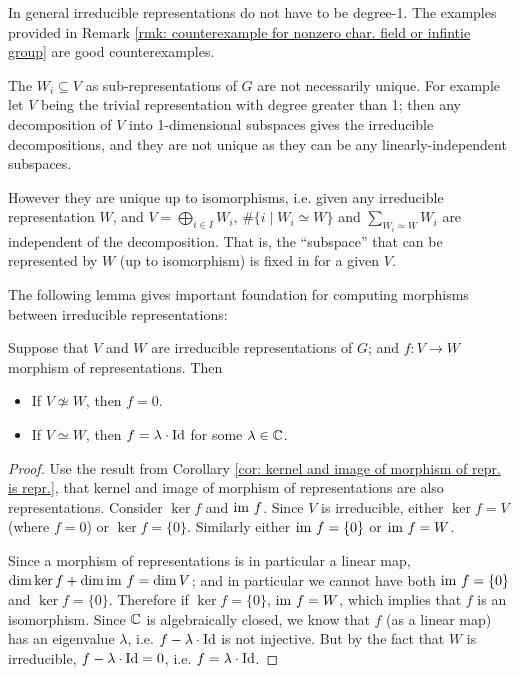 \documentclass{article}
\begin{document}
\begin{remark}
    In general irreducible representations do not have to be degree-1. The examples provided in Remark \ref{rmk: counterexample for nonzero char. field or infintie group} are good counterexamples. 
\end{remark}

\begin{remark}\label{rmk: decomposition of repr. unique up to isom}
    The $W_i \subseteq V$ as sub-representations of $G$ are not necessarily unique. For example let $V$ being the trivial representation with degree greater than 1; then any decomposition of $V$ into 1-dimensional subspaces gives the irreducible decompositions, and they are not unique as they can be any linearly-independent subspaces.

    However they are unique up to isomorphisms, i.e. given any irreducible representation $W$, and $V = \bigoplus_{i \in I} W_i$, $\#\{ i \mid W_i \simeq W \}$ and $\sum_{W_i \simeq W} W_i$ are independent of the decomposition. That is, the ``subspace'' that can be represented by $W$ (up to isomorphism) is fixed in for a given $V$. 
\end{remark}

\textstart
The following lemma gives important foundation for computing morphisms between irreducible representations:

\begin{lemma}[Schur]\label{lem: Schur}
    Suppose that $V$ and $W$ are irreducible representations of $G$; and $f: V \to W$ morphism of representations. Then
    \begin{itemize}
        \item If $V \nsimeq W$, then $f = 0$.
        \item If $V \simeq W$, then $f = \lambda\cdot\mathrm{Id}$ for some $\lambda \in \mathbb{C}$.
    \end{itemize}
\end{lemma}

\begin{proof}
    Use the result from Corollary \ref{cor: kernel and image of morphism of repr. is repr.}, that kernel and image of morphism of representations are also representations. Consider $\ker f$ and $\mathrm{im}\  f$. Since $V$ is irreducible, either $\ker f = V$ (where $f = 0$) or $\ker f = \{0\}$. Similarly either $\mathrm{im}\  f = \{0\}$ or $\mathrm{im}\  f = W$.
    
    Since a morphism of representations is in particular a linear map, $\dim \ker f + \dim \mathrm{im}\  f = \dim V$; and in particular we cannot have both $\mathrm{im}\  f = \{0\}$ and $\ker f = \{0\}$. Therefore if $\ker f = \{0\}$, $\mathrm{im}\  f = W$, which implies that $f$ is an isomorphism. Since $\mathbb{C}$ is algebraically closed, we know that $f$ (as a linear map) has an eigenvalue $\lambda$, i.e. $f - \lambda \cdot \mathrm{Id}$ is not injective. But by the fact that $W$ is irreducible, $f - \lambda \cdot \mathrm{Id} = 0$, i.e. $f = \lambda \cdot \mathrm{Id}$. 
\end{proof}
\end{document}
